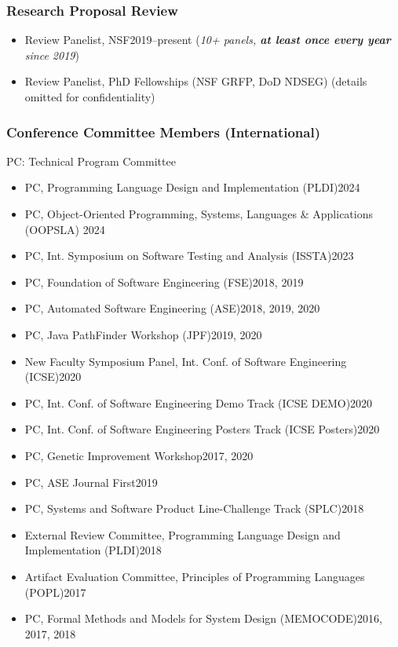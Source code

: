 \documentclass[11pt]{article}
\begin{document}
\subsubsection{Research Proposal Review}
\begin{itemize}
    \item Review Panelist, NSF\hfill 2019--present (\emph{10+ panels, \textbf{at least once every year} since 2019})
    \item Review Panelist, PhD Fellowships (NSF GRFP, DoD NDSEG) \hfill (details omitted for confidentiality)
\end{itemize}

\subsubsection{Conference Committee Members (International)}

\begin{description}[before=\small]
    \item PC: Technical Program Committee
\end{description}

\begin{itemize}
    \item PC, Programming Language Design and Implementation (PLDI)\hfill 2024
    \item PC, Object-Oriented Programming, Systems, Languages \& Applications (OOPSLA) \hfill 2024
    \item PC,  Int. Symposium on Software Testing and Analysis (ISSTA)\hfill 2023
    \item PC, Foundation of Software Engineering (FSE)\hfill 2018, 2019
    \item PC, Automated Software Engineering (ASE)\hfill 2018, 2019, 2020
    \item PC, Java PathFinder Workshop (JPF)\hfill 2019, 2020
    \item New Faculty Symposium Panel, Int. Conf. of Software Engineering (ICSE)\hfill 2020
    \item PC, Int. Conf. of Software Engineering Demo Track (ICSE DEMO)\hfill 2020
    \item PC, Int. Conf. of Software Engineering Posters Track (ICSE Posters)\hfill 2020
    \item PC, Genetic Improvement Workshop\hfill 2017, 2020
    \item PC, ASE Journal First\hfill 2019
    \item PC, Systems and Software Product Line-Challenge Track (SPLC)\hfill 2018
    \item External Review Committee, Programming Language Design and Implementation (PLDI)\hfill 2018
    \item Artifact Evaluation Committee, Principles of Programming Languages (POPL)\hfill 2017
    \item PC, Formal Methods and Models for System Design (MEMOCODE)\hfill 2016, 2017, 2018
\end{itemize}
\end{document}
